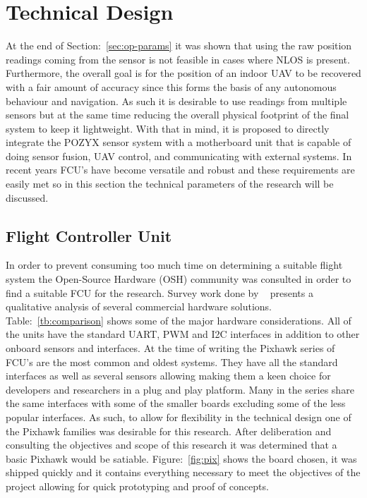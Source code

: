 \section{Technical Design}\label{sec:technical-design}
At the end of Section:~\ref{sec:op-params} it was shown that using the raw position readings coming from the sensor is not feasible in cases where NLOS is present.
Furthermore, the overall goal is for the position of an indoor UAV to be recovered with a fair amount of accuracy since this forms the basis of any autonomous behaviour and navigation.
As such it is desirable to use readings from multiple sensors but at the same time reducing the overall physical footprint of the final system to keep it lightweight.
With that in mind, it is proposed to directly integrate the POZYX sensor system with a motherboard unit that is capable of doing sensor fusion, UAV control, and communicating with external systems.
In recent years FCU's have become versatile and robust and these requirements are easily met so in this section the technical parameters of the research will be discussed.

\subsection{Flight Controller Unit}\label{subsec:flight-controller-unit}
In order to prevent consuming too much time on determining a suitable flight system the Open-Source Hardware (OSH) community was consulted in order to find a suitable FCU for the research.
Survey work done by ~\citet{ebeid2018survey} presents a qualitative analysis of several commercial hardware solutions.
Table:~\ref{tb:comparison} shows some of the major hardware considerations.
All of the units have the standard UART, PWM and I2C interfaces in addition to other onboard sensors and interfaces.
At the time of writing the Pixhawk series of FCU's are the most common and oldest systems.
They have all the standard interfaces as well as several sensors allowing making them a keen choice for developers and researchers in a plug and play platform.
Many in the series share the same interfaces with some of the smaller boards excluding some of the less popular interfaces.
As such, to allow for flexibility in the technical design one of the Pixhawk families was desirable for this research.
After deliberation and consulting the objectives and scope of this research it was determined that a basic Pixhawk would be satiable.
Figure:~\ref{fig:pix} shows the board chosen, it was shipped quickly and it contains everything necessary to meet the objectives of the project allowing for quick prototyping and proof of concepts.

